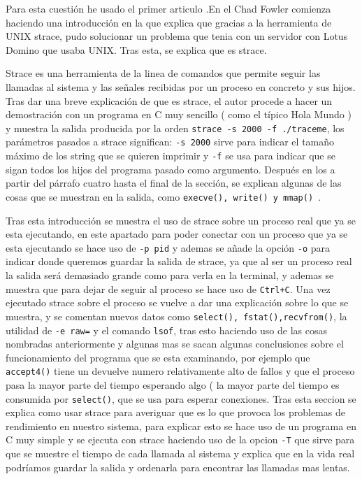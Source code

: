 Para esta cuestión he usado el primer articulo \cite{fw}.En el Chad Fowler comienza haciendo una introducción en la que explica que gracias a la herramienta de UNIX strace, pudo solucionar un problema que tenia con un servidor con Lotus Domino que usaba UNIX. Tras esta, se explica que es strace. 


Strace es una herramienta de la linea de comandos que permite seguir las llamadas al sistema y las señales recibidas por un proceso en concreto y sus hijos. Tras dar una breve explicación de que es strace, el autor procede a hacer un demostración con un programa en C muy sencillo ( como el típico Hola Mundo ) y muestra la salida producida por la orden \texttt{strace -s 2000 -f ./traceme}, los parámetros pasados a strace significan: \texttt{-s 2000} sirve para indicar el tamaño máximo de los string que se quieren imprimir y \texttt{-f} se usa para indicar que se sigan todos los hijos del programa pasado como argumento. Después en los a partir del párrafo cuatro hasta el final de la sección, se explican algunas de las cosas que se muestran en la salida, como \texttt{execve(), write() y mmap() }.

Tras esta introducción se muestra el uso de strace sobre un proceso real que ya se esta ejecutando, en este apartado para poder conectar con un proceso que ya se esta ejecutando se hace uso de \texttt{-p pid} y ademas se añade la opción \texttt{-o} para indicar donde queremos guardar la salida de strace, ya que al ser un proceso real la salida será demasiado grande como para verla en la terminal, y ademas se muestra que para dejar de seguir al proceso se hace uso de \texttt{Ctrl+C}. Una vez ejecutado strace sobre el proceso se vuelve a dar una explicación sobre lo que se muestra, y se comentan nuevos datos como \texttt{select(), fstat(),recvfrom()}, la utilidad de \texttt{-e raw=} y el comando \texttt{lsof}, tras esto haciendo uso de las cosas nombradas anteriormente y algunas mas se sacan algunas conclusiones sobre el funcionamiento del programa que se esta examinando, por ejemplo que \texttt{accept4()} tiene un devuelve numero relativamente alto de fallos y que el proceso pasa la mayor parte del tiempo esperando algo ( la mayor parte del tiempo es consumida por \texttt{select()}, que se usa para esperar conexiones. 
Tras esta seccion se explica como usar strace para averiguar que es lo que provoca los problemas de rendimiento en nuestro sistema, para explicar esto se hace uso de un programa en C muy simple y se ejecuta con strace haciendo uso de la opcion \texttt{-T} que sirve para que se muestre el tiempo de cada llamada al sistema y explica que en la vida real podríamos guardar la salida y ordenarla para encontrar las llamadas mas lentas. 


